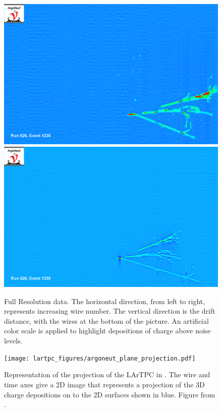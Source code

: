 \begin{figure}[htbp]
  \centering
  \includegraphics[width=\textwidth]{lartpc_figures/R626_E1236_collection.png}
  \includegraphics[width=\textwidth]{lartpc_figures/R626_E1236_induction.png}
  \caption[\argoneut Event Images]{Full Resolution \argoneut data.  The horizontal direction, from left to right, represents increasing wire number.  The vertical direction is the drift distance, with the wires at the bottom of the picture.  An artificial color scale is applied to highlight depositions of charge above noise levels.}
  \label{fig:argoneut_data}
\end{figure}

\begin{figure}[htbp]
  \centering
  \texttt{[image: lartpc\_figures/argoneut\_plane\_projection.pdf]}
  \caption[\argoneut 3D projection]{Representation of the projection of the LArTPC in \argoneut.  The wire and time axes give a 2D image that represents a projection of the 3D charge depositions on to the 2D surfaces shown in blue.  Figure from \cite{Anderson:2012vc}.}
  \label{fig:argoneut_projection}
\end{figure}

